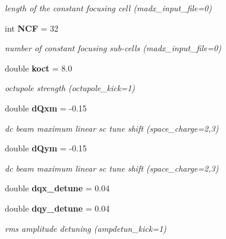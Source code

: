 \begin{CompactItemize}
\begin{CompactList}\small\item\em length of the constant focusing cell (madx\_\-input\_\-file=0)\item\end{CompactList}\item 
int {\bf NCF} = 32\label{group__Lattice_a7}

\begin{CompactList}\small\item\em number of constant focusing sub-cells (madx\_\-input\_\-file=0)\item\end{CompactList}\item 
double {\bf koct} = 8.0\label{group__Lattice_a8}

\begin{CompactList}\small\item\em octupole strength (octupole\_\-kick=1)\item\end{CompactList}\item 
double {\bf d\-Qxm} = -0.15\label{group__Lattice_a9}

\begin{CompactList}\small\item\em dc beam maximum linear sc tune shift (space\_\-charge=2,3)\item\end{CompactList}\item 
double {\bf d\-Qym} = -0.15\label{group__Lattice_a10}

\begin{CompactList}\small\item\em dc beam maximum linear sc tune shift (space\_\-charge=2,3)\item\end{CompactList}\item 
double {\bf dqx\_\-detune} = 0.04\label{group__Lattice_a11}

\item 
double {\bf dqy\_\-detune} = 0.04\label{group__Lattice_a12}

\begin{CompactList}\small\item\em rms amplitude detuning (ampdetun\_\-kick=1)\item\end{CompactList}\end{CompactItemize}
